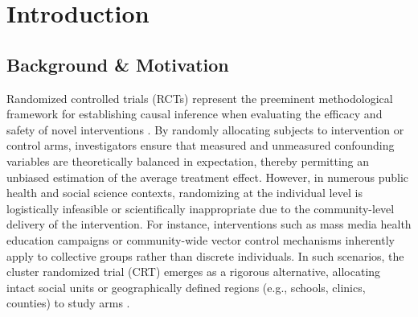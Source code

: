\documentclass[11pt]{article}
\begin{document}
\setcounter{section}{0} %

\section{Introduction}

\subsection{Background \& Motivation}

Randomized controlled trials (RCTs) represent the preeminent methodological framework for establishing causal inference when evaluating the efficacy and safety of novel interventions \cite{pocock_clinical_1983, smith_field_2015}. By randomly allocating subjects to intervention or control arms, investigators ensure that measured and unmeasured confounding variables are theoretically balanced in expectation, thereby permitting an unbiased estimation of the average treatment effect. However, in numerous public health and social science contexts, randomizing at the individual level is logistically infeasible or scientifically inappropriate due to the community-level delivery of the intervention. For instance, interventions such as mass media health education campaigns or community-wide vector control mechanisms inherently apply to collective groups rather than discrete individuals. In such scenarios, the cluster randomized trial (CRT) emerges as a rigorous alternative, allocating intact social units or geographically defined regions (e.g., schools, clinics, counties) to study arms \cite{hayes_cluster_2017, donner_design_2000}.
\end{document}
